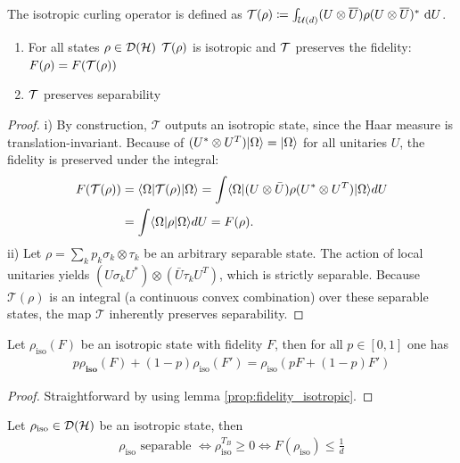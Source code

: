 \begin{definition}
    The isotropic curling operator is defined as $\mathcal T(\rho)\coloneqq \int_{\mathcal U(d)} (U\otimes \overline U)\rho (U \otimes \overline U)^*\ \mathrm{d} U$.
\end{definition}
\begin{lemma}
    \begin{enumerate}
        \item For all states $\rho \in \mathcal D(\mathcal{H})$ $\mathcal T(\rho)$ is isotropic and $\mathcal T$ preserves the fidelity: $F(\rho) = F(\mathcal T(\rho))$
        \item $\mathcal T$ preserves separability
    \end{enumerate}
\end{lemma}
\begin{proof}
i) By construction, $\mathcal{T}$ outputs an isotropic state, since the Haar measure is translation-invariant. Because of $(U^* \otimes U^T)\lvert\Omega\rangle = \lvert\Omega\rangle$ for all unitaries $U$, the fidelity is preserved under the integral:
\begin{align*}
    F(\mathcal{T}(\rho)) &= \langle\Omega\rvert \mathcal{T}(\rho) \lvert\Omega\rangle = \int \langle\Omega\rvert (U \otimes \bar{U}) \rho (U^* \otimes U^T) \lvert\Omega\rangle dU \\
    &= \int \langle\Omega\rvert \rho \lvert\Omega\rangle dU = F(\rho).
\end{align*}
ii) Let $\rho = \sum_k p_k \sigma_k \otimes \tau_k$ be an arbitrary separable state. The action of local unitaries yields $(U \sigma_k U^*) \otimes (\bar{U} \tau_k U^T)$, which is strictly separable. Because $\mathcal{T}(\rho)$ is an integral (a continuous convex combination) over these separable states, the map $\mathcal{T}$ inherently preserves separability.
\end{proof}
\begin{lemma}
    Let $\rho_\text{iso}(F)$ be an isotropic state with fidelity $F$, then for all $p \in [0,1]$ one has  
    \begin{align*}
        p\rho_\textbf{iso}(F)+(1-p)\rho_\text{iso}(F') = \rho_\text{iso}(pF+(1-p)F')
    \end{align*}
\end{lemma}
\begin{proof}
    Straightforward by using lemma \ref{prop:fidelity_isotropic}.
\end{proof}
\begin{prop}
    Let $\rho_\text{iso} \in \mathcal D(\mathcal{H})$ be an isotropic state, then 
    \begin{align*}
        \rho_\text{iso} \text{ separable }\Leftrightarrow \rho_\text{iso}^{T_B}\geq 0 \Leftrightarrow F(\rho_\text{iso})\leq \frac{1}{d}
    \end{align*}
\end{prop}
